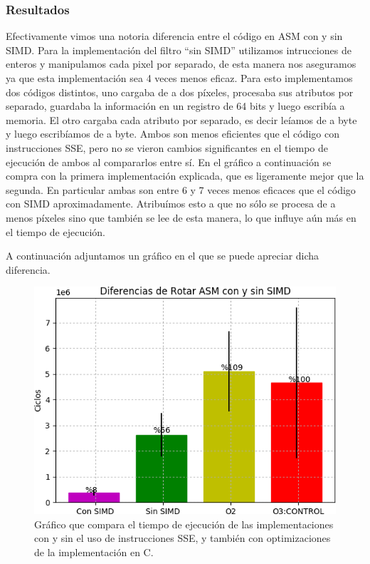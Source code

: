 \subsubsection{Resultados}
\par{Efectivamente vimos una notoria diferencia entre el código en ASM con y sin SIMD.
Para la implementación del filtro ``sin SIMD'' utilizamos intrucciones de enteros y manipulamos cada pixel por separado, de esta manera nos aseguramos ya que esta implementación sea 4 veces menos eficaz. Para esto implementamos dos códigos distintos, uno cargaba de a dos píxeles, procesaba sus atributos por separado, guardaba la información en un registro de 64 bits y luego escribía a memoria. El otro cargaba cada atributo por separado, es decir leíamos de a byte y luego escribíamos de a byte. Ambos son menos eficientes que el código con instrucciones SSE, pero no se vieron  cambios significantes en el tiempo de ejecución de ambos al compararlos entre sí. En el gráfico a continuación se compra con la primera implementación explicada, que es ligeramente mejor que la segunda. En particular ambas son entre 6 y 7 veces menos eficaces que el código con SIMD aproximadamente. Atribuímos esto a que no sólo se procesa de a menos píxeles sino que también se lee de esta manera, lo que influye aún más en el tiempo de ejecución.}
\par{A continuación adjuntamos un gráfico en el que se puede apreciar dicha diferencia.}
	
\begin{figure}[H]
\centering
\captionsetup{justification=centering}
	\includegraphics[width = 12 cm, height = 7 cm]{imagenes/RotarSinSIMD.png}
\caption[center]{Gráfico que compara el tiempo de ejecución de las implementaciones con y sin el uso de instrucciones SSE, y también con optimizaciones de la implementación en C.}
\end{figure}

